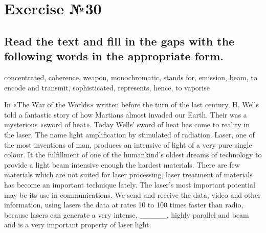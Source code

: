 \section*{Exercise №30}
\subsection*{Read the text and fill in the gaps with the following words in the
      appropriate form.}
concentrated, coherence, weapon, monochromatic, stands for, emission, beam, to encode
and transmit, sophisticated, represents, hence, to vaporise

In «The War of the Worlds» written before the turn of the last century, H. Wells told
a fantastic story of how Martians almost invaded our Earth. Their 
\underline{\hspace{2cm}} was a mysterious «sword of heat». Today Wells’ sword of heat has come to
reality in the laser. The name \underline{\hspace{2cm}} light amplification by
stimulated \underline{\hspace{2cm}} of radiation. Laser, one of the most 
\underline{\hspace{2cm}} inventions of man, produces an intensive \underline{\hspace{2cm}} of light
of a very pure single colour. It \underline{\hspace{2cm}} the fulfillment of one
of the humankind’s oldest dreams of technology to provide a light beam intensive
enough \underline{\hspace{2cm}} the hardest materials. There are few materials which
are not suited for laser processing, \underline{\hspace{2cm}} laser treatment of
materials has become an important technique lately. The laser’s most important
potential may be its use in communications. We send and receive the data, video and
other information, using lasers \underline{\hspace{2cm}} the data at rates 10 to 100
times faster than radio, because lasers can generate a very intense, 
\_\_\_\_\_, highly parallel and \underline{\hspace{2cm}} beam and 
\underline{\hspace{2cm}} is a very important property of laser light.

